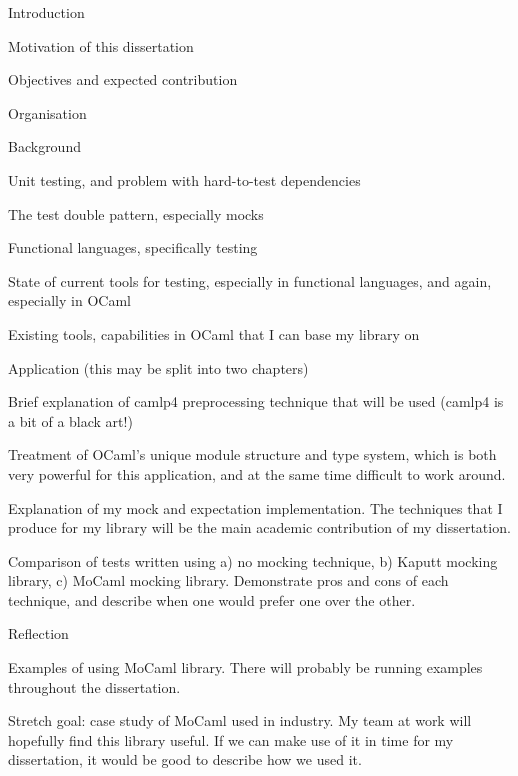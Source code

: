 \documentclass[proposal]{softeng}
\begin{document}
\begin{outline}
\item Introduction
  \begin{outline}
  \item Motivation of this dissertation
  \item Objectives and expected contribution
  \item Organisation
  \end{outline}
\item Background
  \begin{outline}
  \item Unit testing, and problem with hard-to-test dependencies
  \item The test double pattern, especially mocks
  \item Functional languages, specifically testing
  \item State of current tools for testing, especially in
    functional languages, and again, especially in OCaml
  \item Existing tools, capabilities in OCaml that I can base my library on
  \end{outline}
\item Application (this may be split into two chapters)
  \begin{outline}
  \item Brief explanation of camlp4 preprocessing technique that
    will be used (camlp4 is a bit of a black art!)
  \item Treatment of OCaml's unique module structure and type
    system, which is both very powerful for this application, and at
    the same time difficult to work around.
  \item Explanation of my mock and expectation implementation. The
    techniques that I produce for my library will be the main
    academic contribution of my dissertation.
  \item Comparison of tests written using a) no mocking technique,
    b) Kaputt mocking library, c) MoCaml mocking
    library. Demonstrate pros and cons of each technique, and
    describe when one would prefer one over the other.
  \end{outline}
\item Reflection
  \begin{outline}
  \item Examples of using MoCaml library. There will probably be running
    examples throughout the dissertation.
  \item Stretch goal: case study of MoCaml used in industry. My team
    at work will hopefully find this library useful. If we can make
    use of it in time for my dissertation, it would be good to
    describe how we used it.
  \end{outline}
\end{outline}

\nocite{*}


\end{document}
